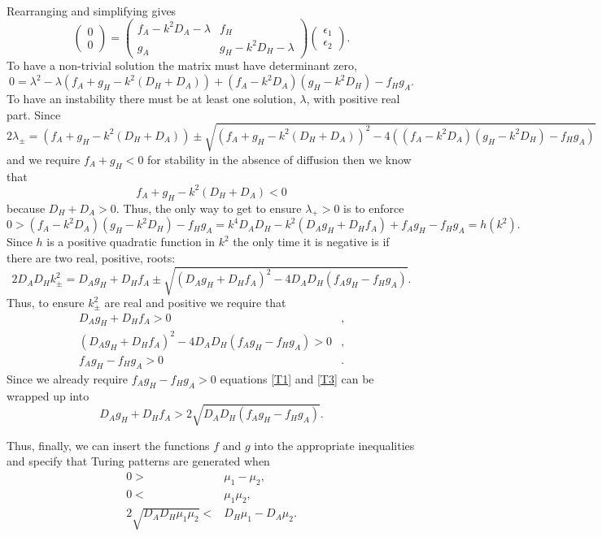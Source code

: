 \documentclass[10pt]{article}
\newcommand{\bb}{\begin{equation}}
\newcommand{\ee}{\end{equation}}
\renewcommand{\l}{\left(}
\renewcommand{\r}{\right)}
\begin{document}
\begin{Answ}
\begin{enumerate}
\begin{align}
\end{align}
Rearranging and simplifying gives
\bb
\l\begin {array}{c} 0 \\ 0 \end {array} \r=\l\begin {array}{cc} f_A-k^2D_A-\lambda & f_H \\ g_A & g_H-k^2D_H-\lambda\end {array} \r\l\begin {array}{c} \epsilon_1 \\ \epsilon_2\end {array} \r.
\ee
To have a non-trivial solution the matrix must have determinant zero,
\bb
0=\lambda^2-\lambda(f_A+g_H-k^2(D_H+D_A))+(f_A-k^2D_A)(g_H-k^2D_H)-f_Hg_A.
\ee
To have an instability there must be at least one solution, $\lambda$, with positive real part. Since
\bb
2\lambda_\pm=(f_A+g_H-k^2(D_H+D_A))\pm\sqrt{(f_A+g_H-k^2(D_H+D_A))^2-4((f_A-k^2D_A)(g_H-k^2D_H)-f_Hg_A)}
\ee
and we require $f_A+g_H<0$ for stability in the absence of diffusion then we know that 
\bb
f_A+g_H-k^2(D_H+D_A)<0
\ee
because $D_H+D_A>0$. Thus, the only way to get to ensure $\lambda_+>0$ is to enforce
\bb
0>(f_A-k^2D_A)(g_H-k^2D_H)-f_Hg_A=k^4D_AD_H-k^2(D_Ag_H+D_Hf_A)+f_Ag_H-f_Hg_A=h(k^2).
\ee
Since $h$ is a positive quadratic function in $k^2$ the only time it is negative is if there are two real, positive, roots:
\bb
2D_AD_Hk^2_\pm= D_Ag_H+D_Hf_A\pm\sqrt{(D_Ag_H+D_Hf_A)^2-4D_AD_H(f_Ag_H-f_Hg_A)}.
\ee
Thus, to ensure $k^2_\pm$ are real and positive we require that
\begin{align}
D_Ag_H+D_Hf_A>0&,\label{T1}\\
(D_Ag_H+D_Hf_A)^2-4D_AD_H(f_Ag_H-f_Hg_A)>0&,\label{T2}\\
f_Ag_H-f_Hg_A>0&.\label{T3}
\end{align}
Since we already require $f_Ag_H-f_Hg_A>0$ equations \eqref{T1} and \eqref{T3} can be wrapped up into
\bb
D_Ag_H+D_Hf_A>2\sqrt{D_AD_H(f_Ag_H-f_Hg_A)}.
\ee

Thus, finally, we can insert the functions $f$ and $g$ into the appropriate inequalities and specify that Turing patterns are generated when
\begin{align}
0>&\mu_{{1}}-\mu_{{2}},\\
0<&\mu_1\mu_2,\\
2\sqrt{D_AD_H\mu_1\mu_2}<&D_H\mu_{{1}}-D_A\mu_{{2}}.
\end{align}


\end{enumerate}
\end{Answ}
\end{document}
